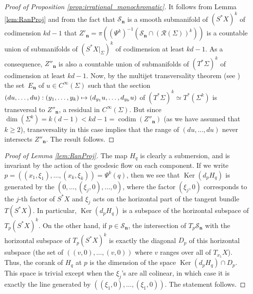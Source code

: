 \documentclass[10pt]{amsart}
\let\mathcal\mathscr
\newcommand\mto{\mathchoice{\longmapsto}{\mapsto}{\mapsto}{\mapsto}}
\DeclareMathOperator{\codim}{codim}
\DeclareMathOperator{\Ker}{Ker}
\theoremstyle{plain}
\theoremstyle{definition}
\def\calS{\mathcal{S}}
\begin{document}
\begin{proof}[Proof of Proposition \ref{prop:irrational_monochromatic}]
It follows from Lemma \ref{lem:RanProj} and from the fact that $\calS_{\boldsymbol{n}}$ is a smooth submanifold of $(S^*X)^k$ of codimension $kd-1$ that $Z'_{\boldsymbol{n}}= \pi \left((\Psi^k)^{-1}(\calS_{\boldsymbol{n}}\cap (\mathcal{R}(\Sigma))^k) \right)$ is a countable union of submanifolds of $(S^*X|_\Sigma)^k$ of codimension at least $kd-1$. As a consequence, $Z''_{\boldsymbol{n}}$ is also a countable union of submanifolds of $(T^*\Sigma)^k$ of codimension at least $kd-1$. Now, by the multijet transversality theorem (see \cite[Th.\,4.13, Chap.\,2]{GG}) the set~$E_{\boldsymbol{n}}$ of $u\in C^\infty(\Sigma)$ such that the section $(du,\dots,du):(y_1,\dots,y_k)\mto (d_{y_1}u,\dots,d_{y_k}u)$ of $(T^*\Sigma)^k\simeq T^*(\Sigma^k)$ is transversal to $Z''_{\boldsymbol{n}}$, a residual in $C^\infty(\Sigma)$. But since $\dim(\Sigma^k)=k(d-1)<kd-1=\codim(Z''_{\boldsymbol{n}})$ (as we have assumed that $k\geq 2$), transversality in this case implies that the range of $(du,\dots,du)$ never intersects $Z''_{\boldsymbol{n}}$.
The result follows.
\end{proof}

\begin{proof}[Proof of Lemma \ref{lem:RanProj}]
The map $H_q$ is clearly a submersion, and is invariant by the action of the geodesic flow on each component. If we write $p= ((x_1,\xi_1),\dots,(x_k,\xi_k)) = \Psi^k(q)$, then we see that
$\Ker(d_p H_q)$ is generated by the $(0,\dots,(\xi_j,0),\dots,0)$, where the factor $(\xi_j,0)$ corresponds to the $j$-th factor of $S^*X$ and $\xi_j$ acts on the horizontal part of the tangent bundle $T(S^*X)$. In particular, $\Ker(d_p H_q)$ is a subspace of the horizontal subspace of $T_p(S^*X)^k$. On the other hand, if $p\in\calS_{\boldsymbol{n}}$, the intersection of $T_p\calS_{\boldsymbol{n}}$ with the horizontal subspace of $T_p(S^*X)^k$ is exactly the diagonal $D_p$ of this horizontal subspace (\ie the set of $((v,0),\dots,(v,0))$ where $v$ ranges over all of $T_{x_1}X$). Thus, the corank of $H_q$ at $p$ is the dimension of the space $\Ker(d_p H_q)\cap D_p$. This space is trivial except when the $\xi_j$'s are all colinear, in which case it is exactly the line generated by $((\xi_1,0),\dots,(\xi_1,0))$. The statement follows.
\end{proof}
\end{document}

